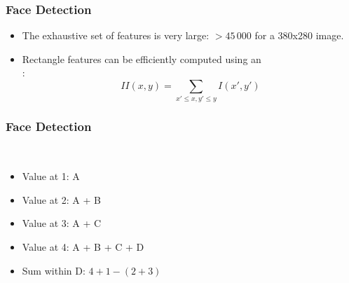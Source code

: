 \begin{frame}
  \frametitle{Face Detection \cont}

  \begin{itemize}
    \item The exhaustive set of features is very large: $> 45\,000$ for a 380x280 image. %
    \item Rectangle features can be efficiently computed using an \\
     :
      \begin{displaymath}
        II(x,y) = \sum_{x' \leq x, y' \leq y} I(x', y')
      \end{displaymath}
  \end{itemize}
  \spread

  \begin{center}
    \resizebox{.4\linewidth}{!}{
      
    }
  \end{center}
\end{frame}


\begin{frame}
  \frametitle{Face Detection \cont}

   \\[.5cm]

  \begin{center}
    \resizebox{.4\linewidth}{!}{
      
    }
  \end{center}

  \begin{itemize}
    \item Value at 1: A %
    \item Value at 2: A + B %
    \item Value at 3: A + C %
    \item Value at 4: A + B + C + D %
    \item Sum within D: $4 + 1 - (2 + 3)$
  \end{itemize}
\end{frame}


